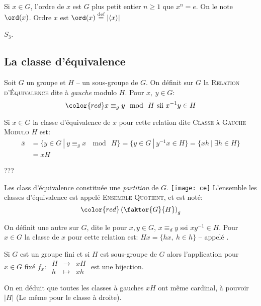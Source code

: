Si  $x\in G$, l'ordre de $x$ est $G$ plus petit entier $n\geq 1$ que $x^n = e$. On le note $\ord(x)$. Ordre $x$ est $\ord(x)\overset{\text{def}}{=}|\langle x\rangle|$

\begin{exercise}
	$S_3$.
\end{exercise}

\subsection{La classe d'équivalence} 

\begin{definition}
	Soit $G$ un groupe et $H$ -- un sous-groupe de $G$. On définit sur $G$ la \textsc{Relation d'Équivalence} dite à \emph{gauche} modulo $H$. Pour $x,\ y\in G$: 
	\[ \color{red} x\equiv_g y \mod\ H \mbox{ sii } x^{-1}y\in H \]
	\vspace{-8mm}
\end{definition}

Si $x\in G$ la classe d'équivalence de $x$ pour cette relation dite \textsc{Classe à Gauche Modulo $H$} est:
\begin{align*}	
	\bar{x} & =\{y\in G\ |\ y\equiv_g x\  \mod\ H\}=\{y\in G\ |\ y^{-1}x\in H\}=\{x h\ |\ \exists h\in H\}\\
	& =xH
\end{align*} 

	???

\begin{remark}
	Les class d'équivalence constituée une \emph{partition} de $G$.
	\texttt{[image: ce]}
	L'ensemble les classes d'équivalence est appelé \textsc{Ensemble Quotient}, et est noté:
	$$ \color{red}\left(	\faktor{G}{H}	\right)_g$$
\end{remark}

On définit une autre  sur $G$, dite  le pour $x, y\in G$, $x\equiv_dy$ ssi $xy^{-1}\in H$. Pour $x\in G$ la classe de $x$ pour cette relation est: $Hx=\{hx,\ h\in h\}$ -- appelé .

Si $G$ est un groupe fini et si $H$ est sous-groupe de $G$ alors l'application pour $x\in G$ fixé $f_x:\ \begin{array}{rcl}H &\rightarrow & xH\\ h &\mapsto & xh\end{array}$ est une bijection.

On en déduit que toutes les classes à gauches $xH$ ont même cardinal, à pouvoir $|H|$ (Le même pour le classe à droite).

